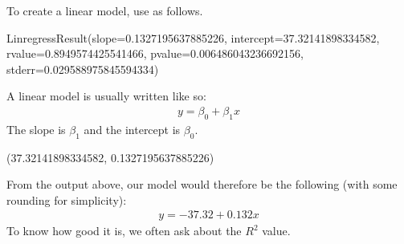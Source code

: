 \documentclass[letterpaper,10pt,english]{jupyterBook}
\begin{document}
\sphinxAtStartPar
To create a linear model, use  as follows.

\begin{sphinxVerbatim}[commandchars=\\\{\}]
     
\end{sphinxVerbatim}

\begin{sphinxVerbatim}[commandchars=\\\{\}]
LinregressResult(slope=0.1327195637885226, intercept=\PYGZhy{}37.32141898334582, rvalue=0.8949574425541466, pvalue=0.006486043236692156, stderr=0.029588975845594334)
\end{sphinxVerbatim}

\sphinxAtStartPar
A linear model is usually written like so:
\begin{equation*}
\begin{split} y = \beta_0 + \beta_1 x \end{split}
\end{equation*}
\sphinxAtStartPar
The slope is \(\beta_1\) and the intercept is \(\beta_0\).

\begin{sphinxVerbatim}[commandchars=\\\{\}]
  
  
 
\end{sphinxVerbatim}

\begin{sphinxVerbatim}[commandchars=\\\{\}]
(\PYGZhy{}37.32141898334582, 0.1327195637885226)
\end{sphinxVerbatim}

\sphinxAtStartPar
From the output above, our model would therefore be the following (with some rounding for simplicity):
\begin{equation*}
\begin{split} y = -37.32 + 0.132x \end{split}
\end{equation*}
\sphinxAtStartPar
To know how good it is, we often ask about the \(R^2\) value.

\begin{sphinxVerbatim}[commandchars=\\\{\}]
  
 
\end{sphinxVerbatim}
\end{document}
